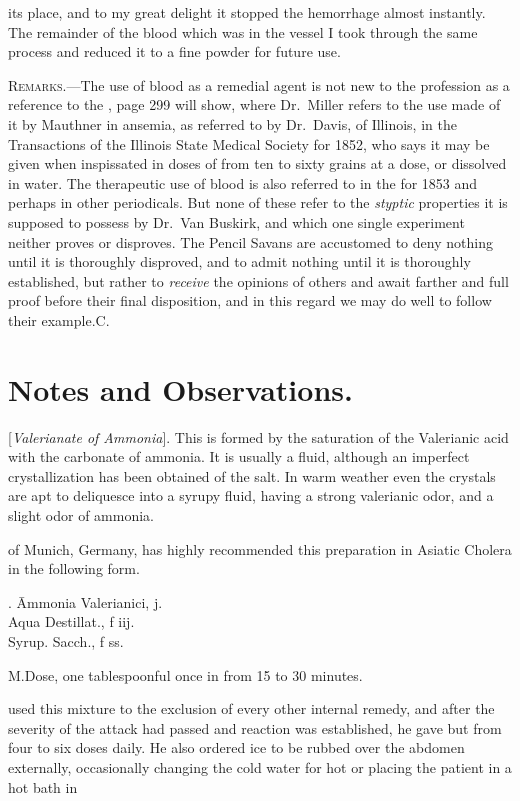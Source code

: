 its place, and to my great delight it stopped the hemorrhage almost
instantly. The remainder of the blood which was in the vessel I took
through the same process and reduced it to a fine powder for future use.

\textsc{Remarks}.---The use of blood as a remedial agent is not new to the
profession as a reference to the , page 299 will show, where
Dr.~Miller refers to the use made of it by Mauthner in ansemia, as
referred to by Dr.~Davis, of Illinois, in the Transactions of the Illinois
State Medical Society for 1852, who says it may be given when inspissated
in doses of from ten to sixty grains at a dose, or dissolved in
water. The therapeutic use of blood is also referred to in the 
for 1853 and perhaps in other periodicals. But none of
these refer to the \emph{styptic} properties it is supposed to possess by Dr.~Van
Buskirk, and which one single experiment neither proves or disproves.
The Pencil Savans are accustomed to deny nothing until it is
thoroughly disproved, and to admit nothing until it is thoroughly established,
but rather to \emph{receive} the opinions of others and await farther
and full proof before their final disposition, and in this regard we may
do well to follow their example.\hfill{}C.\quad

\section*{Notes and Observations.}


 [\emph{Valerianate of Ammonia}]. This is formed
by the saturation of the Valerianic acid with the carbonate of ammonia.
It is usually a fluid, although an imperfect crystallization has been obtained
of the salt. In warm weather even the crystals are apt to deliquesce
into a syrupy fluid, having a strong valerianic odor, and a
slight odor of ammonia.

 of Munich, Germany, has highly recommended this preparation
in Asiatic Cholera in the following form.

\begin{center}
\begin{tabbing}
  \prescription. \= Ammonia Valerianici, \scruple j. \\
    \> Aqua Destillat., f \ounce iij. \\
    \> Syrup. Sacch., f \ounce ss.
\end{tabbing}
\end{center}

M.\quad{}Dose, one tablespoonful once in from 15 to 30 minutes.

 used this mixture to the exclusion of every other internal
remedy, and after the severity of the attack had passed and reaction
was established, he gave but from four to six doses daily. He also
ordered ice to be rubbed over the abdomen externally, occasionally
changing the cold water for hot or placing the patient in a hot bath in\endinput

